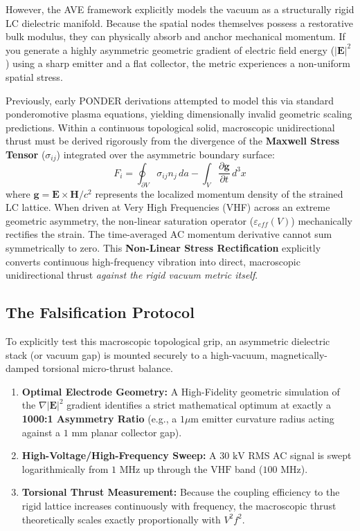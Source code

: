 However, the AVE framework explicitly models the vacuum as a structurally rigid LC dielectric manifold. Because the spatial nodes themselves possess a restorative bulk modulus, they can physically absorb and anchor mechanical momentum. If you generate a highly asymmetric geometric gradient of electric field energy ($|\mathbf{E}|^2$) using a sharp emitter and a flat collector, the metric experiences a non-uniform spatial stress.

Previously, early PONDER derivations attempted to model this via standard ponderomotive plasma equations, yielding dimensionally invalid geometric scaling predictions. Within a continuous topological solid, macroscopic unidirectional thrust must be derived rigorously from the divergence of the \textbf{Maxwell Stress Tensor} ($\sigma_{ij}$) integrated over the asymmetric boundary surface:
\begin{equation}
    F_i = \oint_{\partial V} \sigma_{ij} n_j \, da - \int_V \frac{\partial \mathbf{g}}{\partial t} \, d^3x
\end{equation}
where $\mathbf{g} = \mathbf{E} \times \mathbf{H} / c^2$ represents the localized momentum density of the strained LC lattice. When driven at Very High Frequencies (VHF) across an extreme geometric asymmetry, the non-linear saturation operator ($\varepsilon_{eff}(V)$) mechanically rectifies the strain. The time-averaged AC momentum derivative cannot sum symmetrically to zero. This \textbf{Non-Linear Stress Rectification} explicitly converts continuous high-frequency vibration into direct, macroscopic unidirectional thrust \textit{against the rigid vacuum metric itself}.

\subsection{The Falsification Protocol}
To explicitly test this macroscopic topological grip, an asymmetric dielectric stack (or vacuum gap) is mounted securely to a high-vacuum, magnetically-damped torsional micro-thrust balance.
\begin{enumerate}
    \item \textbf{Optimal Electrode Geometry:} A High-Fidelity geometric simulation of the $\nabla |\mathbf{E}|^2$ gradient identifies a strict mathematical optimum at exactly a \textbf{1000:1 Asymmetry Ratio} (e.g., a $1 \mu\text{m}$ emitter curvature radius acting against a $1 \text{ mm}$ planar collector gap).
    \item \textbf{High-Voltage/High-Frequency Sweep:} A $30 \text{ kV}$ RMS AC signal is swept logarithmically from $1 \text{ MHz}$ up through the $\text{VHF}$ band ($100 \text{ MHz}$).
    \item \textbf{Torsional Thrust Measurement:} Because the coupling efficiency to the rigid lattice increases continuously with frequency, the macroscopic thrust theoretically scales exactly proportionally with $V^2 f^2$.
\end{enumerate}

